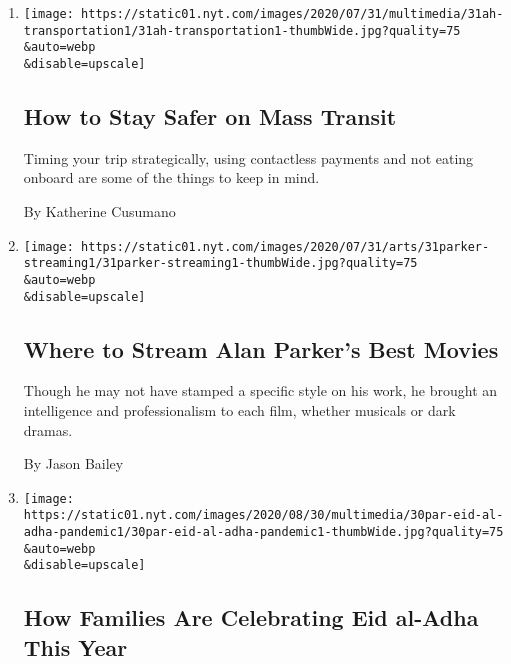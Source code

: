 \begin{enumerate}
\def\labelenumi{\arabic{enumi}.}
\item
  \href{/2020/08/01/at-home/coronavirus-public-transportation-subway.html}{}

  \texttt{[image: https://static01.nyt.com/images/2020/07/31/multimedia/31ah-transportation1/31ah-transportation1-thumbWide.jpg?quality=75\\\&auto=webp\\\&disable=upscale]}

  \hypertarget{how-to-stay-safer-on-mass-transit}{%
  \subsection{How to Stay Safer on Mass
  Transit}\label{how-to-stay-safer-on-mass-transit}}

  Timing your trip strategically, using contactless payments and not
  eating onboard are some of the things to keep in mind.

  By Katherine Cusumano
\item
  \href{/2020/07/31/movies/alan-parker-stream.html}{}

  \texttt{[image: https://static01.nyt.com/images/2020/07/31/arts/31parker-streaming1/31parker-streaming1-thumbWide.jpg?quality=75\\\&auto=webp\\\&disable=upscale]}

  \hypertarget{where-to-stream-alan-parkers-best-movies}{%
  \subsection{Where to Stream Alan Parker's Best
  Movies}\label{where-to-stream-alan-parkers-best-movies}}

  Though he may not have stamped a specific style on his work, he
  brought an intelligence and professionalism to each film, whether
  musicals or dark dramas.

  By Jason Bailey
\item
  \href{/2020/07/31/parenting/eid-al-adha-families-coronavirus.html}{}

  \texttt{[image: https://static01.nyt.com/images/2020/08/30/multimedia/30par-eid-al-adha-pandemic1/30par-eid-al-adha-pandemic1-thumbWide.jpg?quality=75\\\&auto=webp\\\&disable=upscale]}

  \hypertarget{how-families-are-celebrating-eid-al-adha-this-year}{%
  \subsection{How Families Are Celebrating Eid al-Adha This
  Year}\label{how-families-are-celebrating-eid-al-adha-this-year}}


\end{enumerate}
